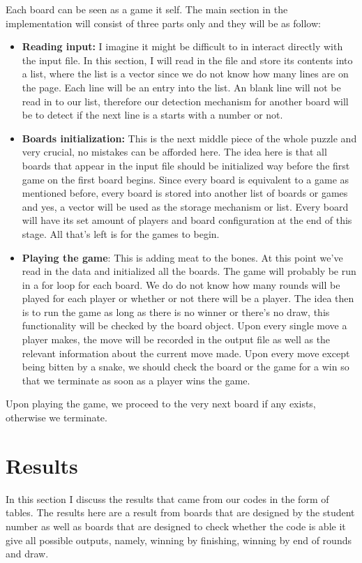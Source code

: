 Each board can be seen as a game it self. The main section in the implementation will consist of three parts only and they will be as follow:


\begin{itemize}
	
	\item \textbf{Reading input:} I imagine it might be difficult to in interact directly with the input file. In this section, I will read in the file and store its contents into a list, where the list is a vector since we do not know how many lines are on the page. Each line will be an entry into the list. An blank line will not be read in to our list, therefore our detection mechanism for another board will be to detect if the next line is a starts with a number or not.
	\item \textbf{Boards initialization:} This is the next middle piece of the whole puzzle and very crucial, no mistakes can be afforded here. The idea here is that all boards that appear in the input file should be initialized way before the first game on the first board begins. Since every board is equivalent to a game as mentioned before, every board is stored into another list of boards or games and yes, a vector will be used as the storage mechanism or list. Every board will have its set amount of players and board configuration at the end of this stage. All that's left is for the games to begin.
	\item \textbf{Playing the game}: This is adding meat to the bones. At this point we've read in the data and initialized all the boards. The game will probably be run in a for loop for each board. We do do not know how many rounds will be played for each player or whether or not there will be a player. The idea then is to run the game as long as there is no winner or there's no draw, this functionality will be checked by the board object. Upon every single move a player makes, the move will be recorded in the output file as well as the relevant information about the current move made. Upon every move except being bitten by a snake, we should check the board or the game for a win so that we terminate as soon as a player wins the game. 
\end{itemize}
Upon playing the game, we proceed to the very next board if any exists, otherwise we terminate.

\section*{Results}
In this section I discuss the results that came from our codes in the form of tables. The results here are a result from boards that are designed by the student number as well as boards that are designed to check whether the code is able it give all possible outputs, namely, winning by finishing, winning by end of rounds and draw.

